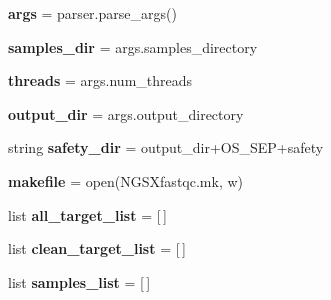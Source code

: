 \begin{DoxyCompactItemize}
\item 
{\bfseries args} = parser.\+parse\+\_\+args()\hypertarget{namespaceNGSXfastqc_a4a2edee448c6444f57611f53cf5d00ff}{}\label{namespaceNGSXfastqc_a4a2edee448c6444f57611f53cf5d00ff}

\item 
{\bfseries samples\+\_\+dir} = args.\+samples\+\_\+directory\hypertarget{namespaceNGSXfastqc_abe1401dae886e75aa72e89d19420cb67}{}\label{namespaceNGSXfastqc_abe1401dae886e75aa72e89d19420cb67}

\item 
{\bfseries threads} = args.\+num\+\_\+threads\hypertarget{namespaceNGSXfastqc_a4374361dc5c51f079c58b4306dc5fde6}{}\label{namespaceNGSXfastqc_a4374361dc5c51f079c58b4306dc5fde6}

\item 
{\bfseries output\+\_\+dir} = args.\+output\+\_\+directory\hypertarget{namespaceNGSXfastqc_ad5858e7f15040e8beec88aaddb1e4110}{}\label{namespaceNGSXfastqc_ad5858e7f15040e8beec88aaddb1e4110}

\item 
string {\bfseries safety\+\_\+dir} = output\+\_\+dir+O\+S\+\_\+\+S\+EP+\textquotesingle{}safety\textquotesingle{}\hypertarget{namespaceNGSXfastqc_a12e926683827e59ec05595e008783b81}{}\label{namespaceNGSXfastqc_a12e926683827e59ec05595e008783b81}

\item 
{\bfseries makefile} = open(\textquotesingle{}N\+G\+S\+Xfastqc.\+mk\textquotesingle{}, \textquotesingle{}w\textquotesingle{})\hypertarget{namespaceNGSXfastqc_a22b50c46f48c702feae97dd7c0dfcdbd}{}\label{namespaceNGSXfastqc_a22b50c46f48c702feae97dd7c0dfcdbd}

\item 
list {\bfseries all\+\_\+target\+\_\+list} = \mbox{[}$\,$\mbox{]}\hypertarget{namespaceNGSXfastqc_ab2fbfffe0e9aa4106dcd6f9c4d40fba9}{}\label{namespaceNGSXfastqc_ab2fbfffe0e9aa4106dcd6f9c4d40fba9}

\item 
list {\bfseries clean\+\_\+target\+\_\+list} = \mbox{[}$\,$\mbox{]}\hypertarget{namespaceNGSXfastqc_a406b5a3bb706e1b3c9a3ba3d6834bca8}{}\label{namespaceNGSXfastqc_a406b5a3bb706e1b3c9a3ba3d6834bca8}

\item 
list {\bfseries samples\+\_\+list} = \mbox{[}$\,$\mbox{]}\hypertarget{namespaceNGSXfastqc_a5fc67ebc3025d07cc04aba28f59e1906}{}\label{namespaceNGSXfastqc_a5fc67ebc3025d07cc04aba28f59e1906}


\end{DoxyCompactItemize}

